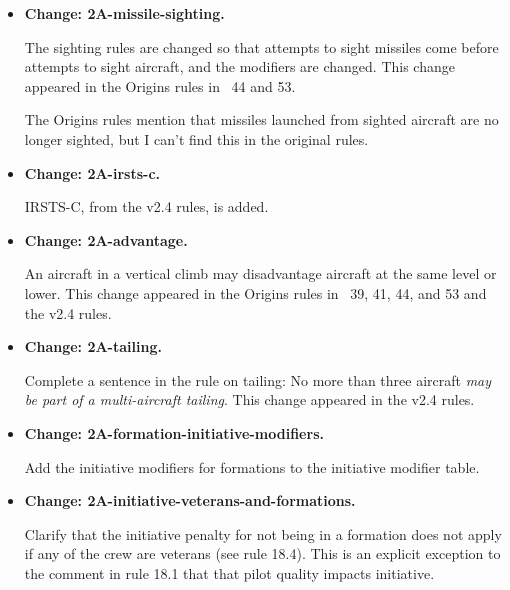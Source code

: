 \documentclass{report}
\newcommand{\changetag}[1]{\textbf{Change: #1.}\par}
\begin{document}
\begin{itemize}
        The unloaded dives rule is changed to follow the Origins rules in {\APJ}~44 and 53 and the v2.4 rules. We use this in version 2A as we believe the rule in {\APJ}~53 is the latest version from an authoritative source. That said, the rule is not completely satisfactory, and is modified somewhat in version 2B.

        This change allows an aircraft in level flight to unload.
        Consequently, a vertical dive must be followed by a steep dive, not level flight with unloading.

    \item\changetag{2A-missile-sighting}

        The sighting rules are changed so that attempts to sight missiles come before attempts to sight aircraft, and the modifiers are changed. This change appeared in the Origins rules in {\APJ}~44 and 53.

        The Origins rules mention that missiles launched from sighted aircraft are no longer sighted, but I can’t find this in the original rules.

    \item\changetag{2A-irsts-c}

        IRSTS-C, from the v2.4 rules, is added.

    \item\changetag{2A-advantage}

        An aircraft in a vertical climb may disadvantage aircraft at the same level or lower. This change appeared in the Origins rules in {\APJ}~39, 41, 44, and 53 and the v2.4 rules.

    \item\changetag{2A-tailing}

        Complete a sentence in the rule on tailing: No more than three aircraft \emph{may be part of a multi-aircraft tailing}. This change appeared in the v2.4 rules.

    \item\changetag{2A-formation-initiative-modifiers}

        Add the initiative modifiers for formations to the initiative modifier table.

    \item\changetag{2A-initiative-veterans-and-formations}

        Clarify that the initiative penalty for not being in a formation does not apply if any of the crew are veterans (see rule 18.4). This is an explicit exception to the comment in rule 18.1 that that pilot quality impacts initiative.


\end{itemize}
\end{document}
